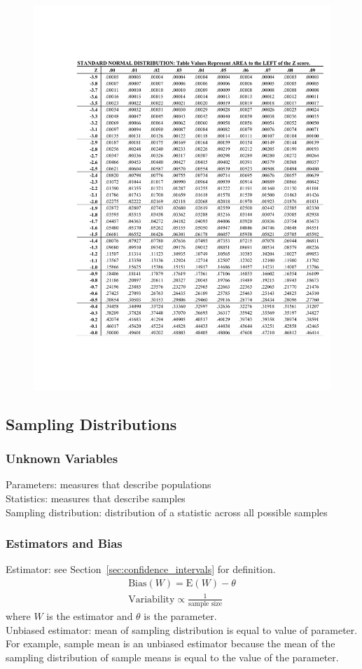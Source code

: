 \documentclass[12pt]{article}
\numberwithin{equation}{section}
\begin{document}
\begin{figure}[!ht]
    \centering
    \includegraphics[page=2, width=0.9\linewidth, trim=4.1cm 4cm 1.15cm 4cm]{standardnormaltable.pdf}
\end{figure}

\subsection{Sampling Distributions}

\subsubsection{Unknown Variables}
Parameters: measures that describe populations \\
Statistics: measures that describe samples \\
Sampling distribution: distribution of a statistic across all possible samples

\subsubsection{Estimators and Bias}
Estimator: see Section~\ref{sec:confidence_intervals} for definition.
\begin{gather}
    \text{Bias}(W) = \text{E}(W)-\theta \\
    \text{Variability} \propto \frac{1}{\text{sample size}}
\end{gather}
where $W$ is the estimator and $\theta$ is the parameter. \\[0.5cm]
Unbiased estimator: mean of sampling distribution is equal to value of parameter. For example, sample mean is an unbiased estimator because the mean of the sampling distribution of sample means is equal to the value of the parameter.
\end{document}
